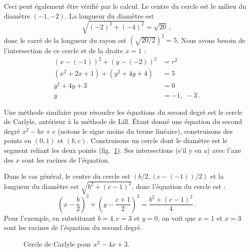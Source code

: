 Ceci peut également être vérifié par le calcul. Le centre du cercle est le milieu du diamètre $(-1,-2)$. La longueur du diamètre est 
\[
\sqrt{(-2)^2+(-4)^2}=\sqrt{20}\,,
\]
donc le carré de la longueur du rayon est $\left(\sqrt{20/2}\right)^2=5$. Nous avons besoin de l'intersection de ce cercle et de la droite $x=1$ :
\begin{align*}
(x-(-1))^2+(y-(-2))^2&=r^2\\
(x^2+2x+1)+(y^2+4y+4)&=5\\
y^2+4y+3&=0\\
y&=-1,\;-3\,.
\end{align*}


Une méthode similaire pour résoudre les équations du second degré est le cercle de Carlyle, antérieur à la méthode de Lill. Étant donné une équation du second degré $x^2-bx+c$ (notons le signe moins du terme linéaire), construisons des points en $(0,1)$ et $(b,c)$. Construisons un cercle dont le diamètre est le segment reliant les deux points (fig.~\ref{f.carlyle-circle}). Ses intersections (s'il y en a) avec l'axe des $x$ sont les racines de l'équation.

Dans le cas général, le centre du cercle est $(b/2,(c-(-1))/2)$ et la longueur du diamètre est $\sqrt{b^2+(c-1)^2}$, donc l'équation du cercle est :
\[
\left(x-\frac{b}{2}\right)^2+\left(y-\frac{c+1}{2}\right)^2=
\frac{b^2+(c-1)^2}{4}\,.
\]
Pour l'exemple, en substituant $b=4,c=3$ et $y=0$, on voit que $x=1$ et $x=3$ sont les racines de l'équation du second degré.


\begin{figure}[htbp]
\centering
{}
\caption{Cercle de Carlyle pour $x^2-4x+3$.}\label{f.carlyle-circle}
\end{figure}


